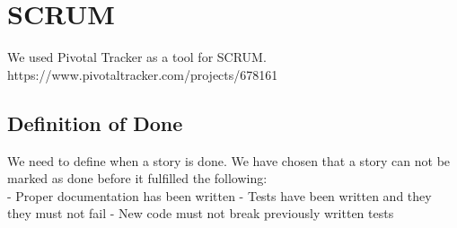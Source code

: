 \section{SCRUM}
We used Pivotal Tracker as a tool for SCRUM.\\
https://www.pivotaltracker.com/projects/678161\\

\subsection{Definition of Done}
We need to define when a story is done. We have chosen that a story can not be
marked as done before it fulfilled the following: \\
- Proper documentation has been written
- Tests have been written and they they must not fail
- New code must not break previously written tests

\newpage
